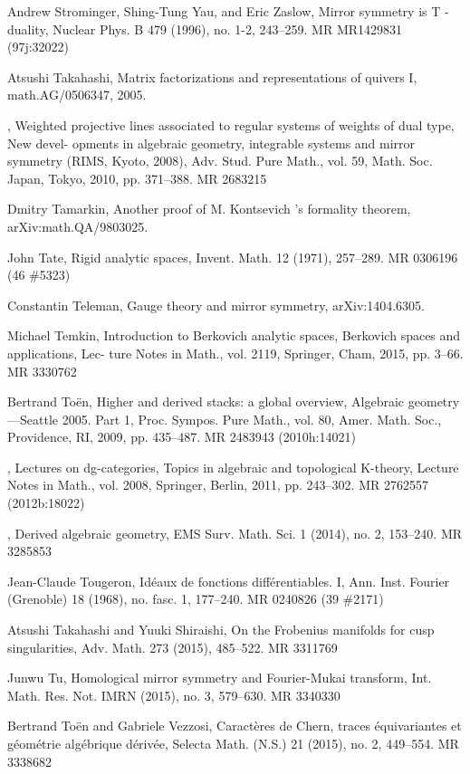 {\begin{list}{}{%
  \setlength{\leftmargin}{3.4em}%
  \setlength{\itemindent}{-3.4em}%
  \setlength{\itemsep}{1.5pt}%
  \setlength{\parsep}{0pt}%
  \setlength{\listparindent}{0pt}%
}
\item[{[SYZ96]}] Andrew Strominger, Shing-Tung Yau, and Eric Zaslow, Mirror symmetry is T -duality, Nuclear Phys. B 479 (1996), no. 1-2, 243--259. MR MR1429831 (97j:32022)
\item[{[Tak05]}] Atsushi Takahashi, Matrix factorizations and representations of quivers I, math.AG/0506347, 2005.
\item[{[Tak10]}] , Weighted projective lines associated to regular systems of weights of dual type, New devel- opments in algebraic geometry, integrable systems and mirror symmetry (RIMS, Kyoto, 2008), Adv. Stud. Pure Math., vol. 59, Math. Soc. Japan, Tokyo, 2010, pp. 371--388. MR 2683215
\item[{[Tam]}] Dmitry Tamarkin, Another proof of M. Kontsevich ’s formality theorem, arXiv:math.QA/9803025.
\item[{[Tat71]}] John Tate, Rigid analytic spaces, Invent. Math. 12 (1971), 257--289. MR 0306196 (46 \#5323)
\item[{[Tel]}] Constantin Teleman, Gauge theory and mirror symmetry, arXiv:1404.6305.
\item[{[Tem15]}] Michael Temkin, Introduction to Berkovich analytic spaces, Berkovich spaces and applications, Lec- ture Notes in Math., vol. 2119, Springer, Cham, 2015, pp. 3--66. MR 3330762
\item[{[To¨e09]}] Bertrand Toën, Higher and derived stacks: a global overview, Algebraic geometry---Seattle 2005. Part 1, Proc. Sympos. Pure Math., vol. 80, Amer. Math. Soc., Providence, RI, 2009, pp. 435--487. MR 2483943 (2010h:14021)
\item[{[To¨e11]}] , Lectures on dg-categories, Topics in algebraic and topological K-theory, Lecture Notes in Math., vol. 2008, Springer, Berlin, 2011, pp. 243--302. MR 2762557 (2012b:18022)
\item[{[To¨e14]}] , Derived algebraic geometry, EMS Surv. Math. Sci. 1 (2014), no. 2, 153--240. MR 3285853
\item[{[Tou68]}] Jean-Claude Tougeron, Idéaux de fonctions différentiables. I, Ann. Inst. Fourier (Grenoble) 18 (1968), no. fasc. 1, 177--240. MR 0240826 (39 \#2171)
\item[{[TS15]}] Atsushi Takahashi and Yuuki Shiraishi, On the Frobenius manifolds for cusp singularities, Adv. Math. 273 (2015), 485--522. MR 3311769
\item[{[Tu15]}] Junwu Tu, Homological mirror symmetry and Fourier-Mukai transform, Int. Math. Res. Not. IMRN (2015), no. 3, 579--630. MR 3340330
\item[{[TV15]}] Bertrand Toën and Gabriele Vezzosi, Caractères de Chern, traces équivariantes et géométrie algébrique dérivée, Selecta Math. (N.S.) 21 (2015), no. 2, 449--554. MR 3338682

\end{list}}
